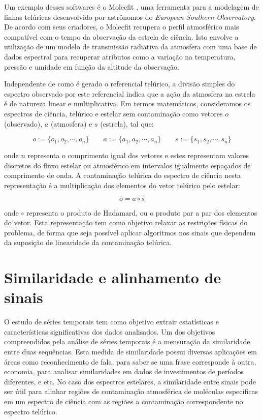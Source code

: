 Um exemplo desses softwares é o Molecfit \citep{smette2015molecfit}, uma ferramenta para a modelagem de linhas telúricas desenvolvido por astrônomos do \textit{European Southern Observatory}. De acordo com seus criadores, o Molecfit recupera o perfil atmosférico mais compatível com o tempo da observação da estrela de ciência. Isto envolve a utilização de um modelo de transmissão radiativa da atmosfera com uma base de dados espectral para recuperar atributos como a variação na temperatura, pressão e umidade em função da altitude da observação.

Independente de como é gerado o referencial telúrico, 
a divisão simples do espectro observado por este referencial indica que a ação da atmosfera na estrela é de natureza linear e multiplicativa.  Em termos matemáticos, consideramos os espectros de ciência, telúrico e estelar sem contaminação como vetores $o$ (observado), $a$ (atmosfera) e $s$ (estrela), tal que:

\begin{equation*}
    o := \{o_1, o_2, \cdots, o_{n}\} \qquad a := \{a_1, a_2, \cdots, a_{n}\} \qquad s := \{s_1, s_2, \cdots, s_{n}\} 
\end{equation*}

\noindent onde $n$ representa o comprimento igual dos vetores e estes representam valores discretos do fluxo estelar ou atmosférico em intervalos igualmente espaçados de comprimento de onda. A contaminação telúrica do espectro de ciência nesta representação é a multiplicação dos elementos do vetor telúrico pelo estelar:

\begin{equation*}
    o = a \circ s
\end{equation*}

\noindent onde $\circ$ representa o produto de Hadamard, ou o produto par a par dos elementos do vetor. Esta representação tem como objetivo relaxar as restrições físicas do problema, de forma que seja possível aplicar algoritmos nos sinais que dependem da suposição de linearidade da contaminação telúrica.


\section{Similaridade e alinhamento de sinais}

O estudo de séries temporais tem como objetivo extrair estatísticas e características significativas dos dados analisados. Um dos objetivos compreendidos pela análise de séries temporais é a mensuração da similaridade entre duas sequências. Esta medida de similaridade possui diversas aplicações em áreas como reconhecimento de fala, para saber se uma frase corresponde à outra, economia, para analisar similaridades em dados de investimentos de períodos diferentes, e etc. No caso dos espectros estelares, a similaridade entre sinais pode ser útil para alinhar regiões de contaminação atmosférica de moléculas específicas em um espectro de ciência com as regiões a contaminação correspondente no espectro telúrico.

